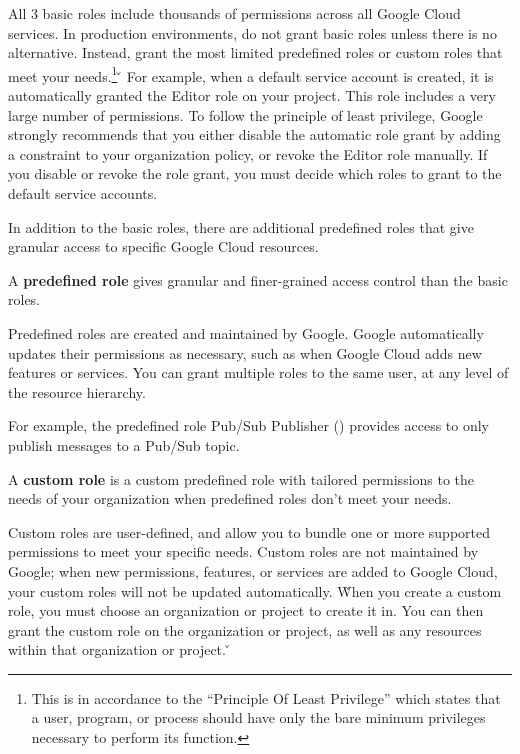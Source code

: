 All 3 basic roles include thousands of permissions across all Google Cloud services. In production environments, do not
grant basic roles unless there is no alternative. Instead, grant the most limited predefined roles or custom roles
that meet your needs.\footnote{This is in accordance to the ``Principle Of Least Privilege'' which states that a user,
program, or process should have only the bare minimum privileges necessary to perform its function.} \v

\be
For example, when a default service account is created, it is automatically granted the Editor role on your project.
This role includes a very large number of permissions. To follow the principle of least privilege, Google strongly
recommends that you either disable the automatic role grant by adding a constraint to your organization policy, or
revoke the Editor role manually. If you disable or revoke the role grant, you must decide which roles to grant to the
default service accounts. \ee

In addition to the basic roles, there are additional predefined roles that give granular access to specific Google
Cloud resources.

A \textbf{predefined role} gives granular and finer-grained access control than the basic roles.
\ed

Predefined roles are created and maintained by Google. Google automatically updates their permissions as necessary,
such as when Google Cloud adds new features or services. You can grant multiple roles to the same user, at any level
of the resource hierarchy.

\be
For example, the predefined role Pub/Sub Publisher () provides access to only publish
messages to a Pub/Sub topic.
\ee

A \textbf{custom role} is a custom predefined role with tailored permissions to the needs of your organization when
predefined roles don't meet your needs.
\ed

Custom roles are user-defined, and allow you to bundle one or more supported permissions to meet your specific needs.
Custom roles are not maintained by Google; when new permissions, features, or services are added to Google Cloud,
your custom roles will not be updated automatically. \v

When you create a custom role, you must choose an organization or project to create it in. You can then grant the
custom role on the organization or project, as well as any resources within that organization or project. \v

